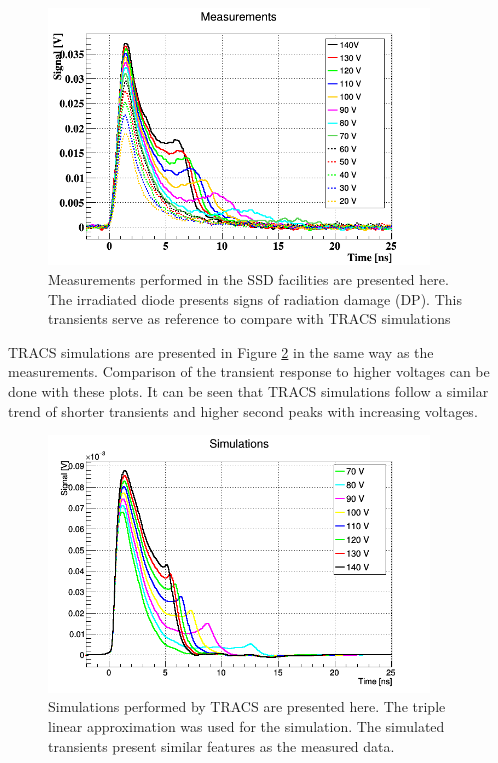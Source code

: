 \begin{figure}[H]
	\centering
	\includegraphics[width=0.9\textwidth]{c1.png}
	\caption{Measurements performed in the SSD facilities are presented here. The irradiated diode presents signs of radiation damage (DP). This transients serve as reference to compare with TRACS simulations}
	\label{fig:allTCT+}
\end{figure}
				
TRACS simulations are presented in Figure \ref{fig:allSims} in the same way as the measurements. Comparison of the transient response to higher voltages can be done with these plots. It can be seen that TRACS simulations follow a similar trend of shorter transients and higher second peaks with increasing voltages.

\begin{figure}[H]
	\centering
	\centering
	\includegraphics[width=0.9\textwidth]{AllSims.png}
	\caption{Simulations performed by TRACS are presented here. The triple linear approximation was used for the simulation. The simulated transients present similar features as the measured data.}
	\label{fig:allSims}
\end{figure}

